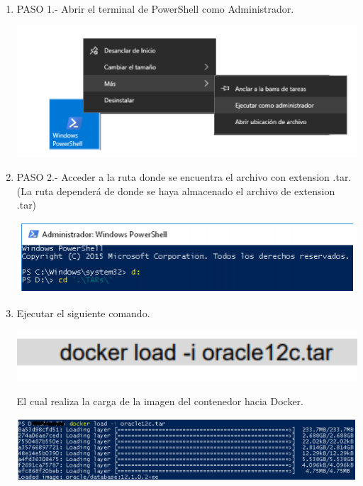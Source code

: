 \documentclass[12pt,letterpaper]{article}
\begin{document}
\begin{enumerate}[1.]
    \item  PASO 1.- Abrir el terminal de PowerShell como Administrador. 
     \begin{center}
\includegraphics[width=15cm]{./IMAGENES/img3}
\end{center} 
    \item PASO 2.- Acceder a la ruta donde se encuentra el archivo con extension .tar. (La ruta dependerá de donde se haya
almacenado el archivo de extension .tar)
\begin{center}
\includegraphics[width=15cm]{./IMAGENES/img4}
\end{center} 

\item Ejecutar el siguiente comando. \\
\begin{center}
\includegraphics[width=15cm]{./IMAGENES/img11}
\end{center} 
El cual realiza la carga de la imagen del contenedor hacia Docker.
\begin{center}
\includegraphics[width=15cm]{./IMAGENES/img5}
\end{center} 


\end{enumerate}
\end{document}
